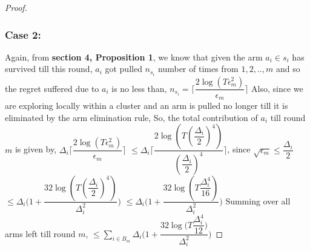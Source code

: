 \begin{proof}
\subsubsection{Case 2:}
Again, from \textbf{section 4, Proposition 1}, we know that given the arm $a_{i}\in s_{i}$ has survived till this round, $a_{i}$ got pulled $n_{s_{i}}$ number of times from $1,2,..,m$ and so the regret suffered due to $a_{i}$ is no less than,
\newline
\hspace*{4em}$n_{s_{i}}=\bigg\lceil\dfrac{2\log{(T\epsilon_{m}^{2})}}{\epsilon_{m}}\bigg\rceil$
\newline
Also, since we are exploring locally within a cluster and an arm is pulled no longer till it is eliminated by the arm elimination rule, 
So, the total contribution of $a_{i}$  till round $m$ is given by,
\newline
\hspace*{4em}$\Delta_{i}\bigg\lceil\dfrac{2\log{(T\epsilon_{m}^{2})}}{\epsilon_{m}}\bigg\rceil$
$\leq\Delta_{i}\bigg\lceil\dfrac{2\log{(T(\dfrac{\Delta_{i}}{2})^{4})}}{(\dfrac{\Delta_{i}}{2})^{4}}\bigg\rceil$, since $\sqrt{\epsilon_{m}}\leq\dfrac{\Delta_{i}}{2}$
\newline
\hspace*{14em}
$\leq\Delta_{i}\bigg(1+\dfrac{32\log{(T(\dfrac{\Delta_{i}}{2})^{4})}}{\Delta_{i}^{2}}\bigg)$
\newline
\hspace*{14em}
$\leq\Delta_{i}\bigg(1+\dfrac{32\log{(T\dfrac{\Delta_{i}^{4}}{16})}}{\Delta_{i}^{2}}\bigg)$
\newline
Summing over all arms left till round $m$,
\newline
\hspace*{4em}$\leq\sum_{i\in B_{m}}\Delta_{i}\bigg(1+\dfrac{32\log{(T\dfrac{\Delta_{i}^{4}}{12}})}{\Delta_{i}^{2}}\bigg)$
\newline

\end{proof}
